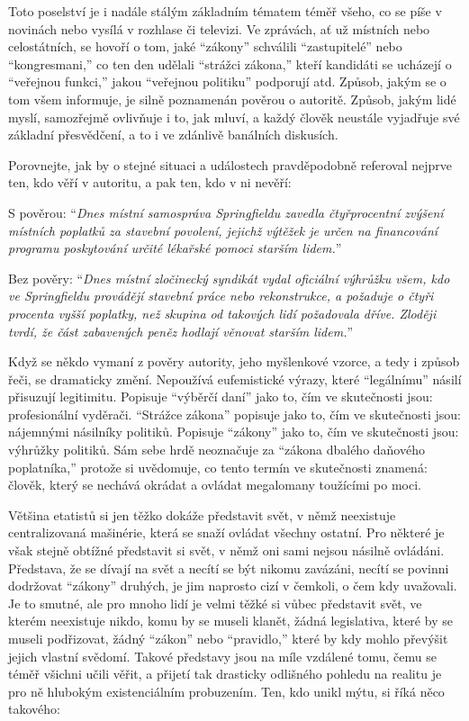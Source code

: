 \documentclass{book}
\begin{document}
Toto poselství je i nadále stálým základním tématem téměř všeho, co se píše v novinách nebo vysílá v rozhlase či televizi. Ve zprávách, ať už místních nebo celostátních, se hovoří o tom, jaké \enquote{zákony} schválili \enquote{zastupitelé} nebo \enquote{kongresmani,} co ten den udělali \enquote{strážci zákona,} kteří kandidáti se ucházejí o \enquote{veřejnou funkci,} jakou \enquote{veřejnou politiku} podporují atd. Způsob, jakým se o tom všem informuje, je silně poznamenán pověrou o autoritě. Způsob, jakým lidé myslí, samozřejmě ovlivňuje i to, jak mluví, a každý člověk neustále vyjadřuje své základní přesvědčení, a to i ve zdánlivě banálních diskusích.

Porovnejte, jak by o stejné situaci a událostech pravděpodobně referoval nejprve ten, kdo věří v autoritu, a pak ten, kdo v ni nevěří:

S pověrou: \enquote{\emph{Dnes místní samospráva Springfieldu zavedla čtyřprocentní zvýšení místních poplatků za stavební povolení, jejichž výtěžek je určen na financování programu poskytování určité lékařské pomoci starším lidem.}}

Bez pověry: \enquote{\emph{Dnes místní zločinecký syndikát vydal oficiální výhrůžku všem, kdo ve Springfieldu provádějí stavební práce nebo rekonstrukce, a požaduje o čtyři procenta vyšší poplatky, než skupina od takových lidí požadovala dříve. Zloději tvrdí, že část zabavených peněz hodlají věnovat starším lidem.}}

Když se někdo vymaní z pověry autority, jeho myšlenkové vzorce, a tedy i způsob řeči, se dramaticky změní. Nepoužívá eufemistické výrazy, které \enquote{legálnímu} násilí přisuzují legitimitu. Popisuje \enquote{výběrčí daní} jako to, čím ve skutečnosti jsou: profesionální vyděrači. \enquote{Strážce zákona} popisuje jako to, čím ve skutečnosti jsou: nájemnými násilníky politiků. Popisuje \enquote{zákony} jako to, čím ve skutečnosti jsou: výhrůžky politiků. Sám sebe hrdě neoznačuje za \enquote{zákona dbalého daňového poplatníka,} protože si uvědomuje, co tento termín ve skutečnosti znamená: člověk, který se nechává okrádat a ovládat megalomany toužícími po moci.

Většina etatistů si jen těžko dokáže představit svět, v němž neexistuje centralizovaná mašinérie, která se snaží ovládat všechny ostatní. Pro některé je však stejně obtížné představit si svět, v němž oni sami nejsou násilně ovládáni. Představa, že se dívají na svět a necítí se být nikomu zavázáni, necítí se povinni dodržovat \enquote{zákony} druhých, je jim naprosto cizí v čemkoli, o čem kdy uvažovali. Je to smutné, ale pro mnoho lidí je velmi těžké si vůbec představit svět, ve kterém neexistuje nikdo, komu by se museli klanět, žádná legislativa, které by se museli podřizovat, žádný \enquote{zákon} nebo \enquote{pravidlo,} které by kdy mohlo převýšit jejich vlastní svědomí. Takové představy jsou na míle vzdálené tomu, čemu se téměř všichni učili věřit, a přijetí tak drasticky odlišného pohledu na realitu je pro ně hlubokým existenciálním probuzením. Ten, kdo unikl mýtu, si říká něco takového:
\end{document}
